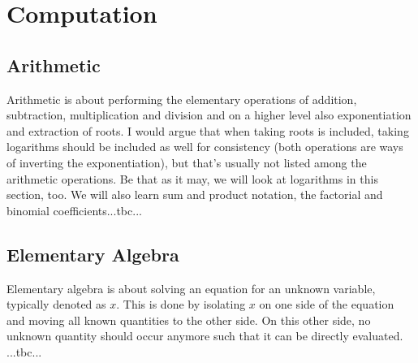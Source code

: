 \section{Computation}


\subsection{Arithmetic}
Arithmetic is about performing the elementary operations of addition, subtraction, multiplication and division and on a higher level also exponentiation and extraction of roots. I would argue that when taking roots is included, taking logarithms should be included as well for consistency (both operations are ways of inverting the exponentiation), but that's usually not listed among the arithmetic operations. Be that as it may, we will look at logarithms in this section, too. We will also learn sum and product notation, the factorial and binomial coefficients...tbc...


\begin{comment}

ToDo:

-give algorithms for long addition, subtarction, multiplication, division
-maybe also for numbers in scientific notation, i.e. floating point numbers
-introduce sum and product notation
 -mayby with a spoiler to infinite sums, use $\sum_{k=1}^{\infty} (1/10)^k = 0.1111... = 1/9$ as example
-introduce factorials and binomial coefficients

References:

https://en.wikipedia.org/wiki/Arithmetic
https://www.britannica.com/science/arithmetic

\end{comment}


\subsection{Elementary Algebra}
Elementary algebra is about solving an equation for an unknown variable, typically denoted as $x$. This is done by isolating $x$ on one side of the equation and moving all known quantities to the other side. On this other side, no unknown quantity should occur anymore such that it can be directly evaluated. ...tbc...


\begin{comment}

ToDo:
-make a (sub)section "Algebraic Reasoning" analogous to the "Geometric Reasoning" section in the Geometry chapter, so we can refer from there to here for analogies

References:

https://en.wikipedia.org/wiki/Elementary_algebra
https://en.wikipedia.org/wiki/Equation

\end{comment}


